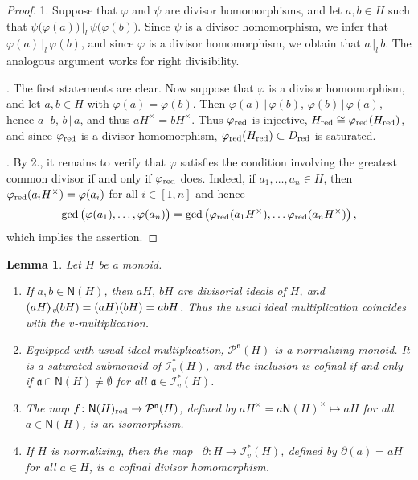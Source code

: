 \documentclass[a4paper]{amsart}
\newtheorem{lemma}[theorem]{Lemma}
\theoremstyle{definition}
\numberwithin{equation}{section}
\begin{document}
\begin{proof}
1. Suppose that $\varphi$ and $\psi$ are divisor homomorphisms, and
let $a, b \in H$ such that $\psi \bigl ( \varphi (a) \bigr) {\, |_l \,} \psi
\bigl ( \varphi (b) \bigr)$. Since $\psi$ is a divisor homomorphism,
we infer that $\varphi (a) {\, |_l \,} \varphi (b)$, and since $\varphi $ is
a divisor homomorphism, we obtain that $a {\, |_l \,} b$. The analogous
argument works for right divisibility.

. The first statements are clear. Now suppose that $\varphi$ is a
divisor homomorphism, and let $a, b \in H$ with $\varphi (a) =
\varphi (b)$. Then $\varphi (a) {\, | \,} \varphi (b)$, $\varphi (b) {\, | \,}
\varphi (a)$, hence $a {\, | \,} b$, $b {\, | \,} a$, and thus $a H^{\times} = b
H^{\times}$. Thus $\varphi_{{\text{\rm red}}}$ is injective, $H_{{\text{\rm red}}} \cong
\varphi_{{\text{\rm red}}}
      (H_{{\text{\rm red}}})$, and since $\varphi_{{\text{\rm red}}}$ is a divisor
      homomorphism, $\varphi_{{\text{\rm red}}}(H_{{\text{\rm red}}}) \subset D_{{\text{\rm red}}}$ is
      saturated.

. By 2., it remains to verify that $\varphi$ satisfies the
condition involving the greatest common divisor if and only if
$\varphi_{{\text{\rm red}}}$ does. Indeed, if $a_1, \ldots, a_n \in H$, then
$\varphi_{{\text{\rm red}}} (a_i H^{\times}) = \varphi (a_i)$ for all $i \in [1,
n]$ and hence
\[
\gcd \big( \varphi (a_1), \ldots, \varphi (a_n) \big) = \gcd \big(
\varphi_{{\text{\rm red}}} (a_1 H^{\times}), \ldots \varphi_{{\text{\rm red}}}
(a_nH^{\times}) \big) \,,
\]
which implies the assertion.
\end{proof}

\medskip
\begin{lemma} \label{4.7}
Let $H$ be a  monoid.
\begin{enumerate}
\item If $a, b \in \mathsf N (H)$, then $aH$, $bH$ are divisorial ideals of $H$, and
$(aH) {\negthinspace \cdot_v \negthinspace} (bH) = (aH)(bH) = abH$. Thus the usual ideal
multiplication coincides with the $v$-multiplication.

\smallskip
\item Equipped with usual ideal multiplication,  $\mathcal P^{\mathsf n} (H)$ is a normalizing
monoid. It is a saturated submonoid of $\mathcal I_v^* (H)$, and the
inclusion is cofinal if and only if $\mathfrak a \cap \mathsf N (H)
\ne \emptyset$ for all $\mathfrak a \in \mathcal I_v^* (H)$.

\smallskip
\item The map $f \colon \mathsf N (H)_{{\text{\rm red}}} \to \mathcal P^{\mathsf n} (H)$, defined by
      $ a H^{\times} = a \mathsf N (H)^{\times} \mapsto aH$ for all $a \in \mathsf N (H)$,
      is an isomorphism.

\smallskip
\item If $H$ is normalizing, then the map \ $\partial \colon H \to \mathcal I_v^* (H)$, defined by
      $\partial (a) = aH$ for all $a \in H$, is a cofinal divisor
      homomorphism.
\end{enumerate}
\end{lemma}
\end{document}
